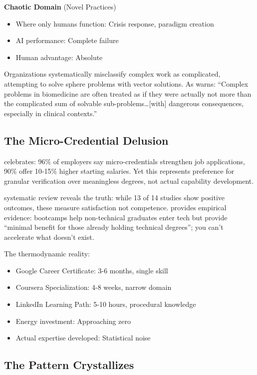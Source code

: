 \textbf{Chaotic Domain} (Novel Practices)
\begin{itemize}
\item Where only humans function: Crisis response, paradigm creation
\item AI performance: Complete failure
\item Human advantage: Absolute
\end{itemize}

Organizations systematically misclassify complex work as complicated, attempting to solve sphere problems with vector solutions. As \citet{kempermann2017} warns: ``Complex problems in biomedicine are often treated as if they were actually not more than the complicated sum of solvable sub-problems\ldots [with] dangerous consequences, especially in clinical contexts.''

\subsection{The Micro-Credential Delusion}

\citet{lumina2025} celebrates: 96\% of employers say micro-credentials strengthen job applications, 90\% offer 10-15\% higher starting salaries. Yet this represents preference for granular verification over meaningless degrees, not actual capability development.

\citet{ha2022} systematic review reveals the truth: while 13 of 14 studies show positive outcomes, these measure satisfaction not competence. \citet{joshi2019} provides empirical evidence: bootcamps help non-technical graduates enter tech but provide ``minimal benefit for those already holding technical degrees''; you can't accelerate what doesn't exist.

The thermodynamic reality:
\begin{itemize}
\item Google Career Certificate: 3-6 months, single skill
\item Coursera Specialization: 4-8 weeks, narrow domain
\item LinkedIn Learning Path: 5-10 hours, procedural knowledge
\item Energy investment: Approaching zero
\item Actual expertise developed: Statistical noise
\end{itemize}

\subsection{The Pattern Crystallizes}

